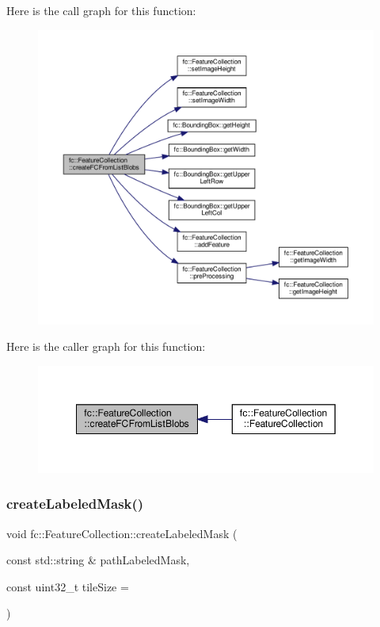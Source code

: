 Here is the call graph for this function\+:
\nopagebreak
\begin{figure}[H]
\begin{center}
\leavevmode
\includegraphics[width=350pt]{d9/d78/classfc_1_1FeatureCollection_a6cb55ca9179ea92ef2dedf9f25531b77_cgraph}
\end{center}
\end{figure}
Here is the caller graph for this function\+:
\nopagebreak
\begin{figure}[H]
\begin{center}
\leavevmode
\includegraphics[width=349pt]{d9/d78/classfc_1_1FeatureCollection_a6cb55ca9179ea92ef2dedf9f25531b77_icgraph}
\end{center}
\end{figure}
\mbox{\label{classfc_1_1FeatureCollection_a42a98939246d7ca645dafa6694b1aaa3}} 
\subsubsection{\texorpdfstring{create\+Labeled\+Mask()}{createLabeledMask()}}
{\footnotesize\ttfamily void fc\+::\+Feature\+Collection\+::create\+Labeled\+Mask (\begin{DoxyParamCaption}\item[{const std\+::string \&}]{path\+Labeled\+Mask,  }\item[{const uint32\+\_\+t}]{tile\+Size = {} }\end{DoxyParamCaption})\hspace{0.3cm}{\ttfamily [inline]}}



